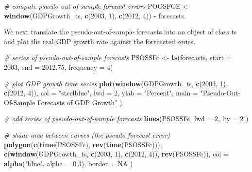 \documentclass[]{book}
\newenvironment{Shaded}{\begin{snugshade}}{\end{snugshade}}
\newcommand{\KeywordTok}[1]{\textcolor[rgb]{0.13,0.29,0.53}{\textbf{#1}}}
\newcommand{\DataTypeTok}[1]{\textcolor[rgb]{0.13,0.29,0.53}{#1}}
\newcommand{\DecValTok}[1]{\textcolor[rgb]{0.00,0.00,0.81}{#1}}
\newcommand{\FloatTok}[1]{\textcolor[rgb]{0.00,0.00,0.81}{#1}}
\newcommand{\StringTok}[1]{\textcolor[rgb]{0.31,0.60,0.02}{#1}}
\newcommand{\CommentTok}[1]{\textcolor[rgb]{0.56,0.35,0.01}{\textit{#1}}}
\newcommand{\OtherTok}[1]{\textcolor[rgb]{0.56,0.35,0.01}{#1}}
\newcommand{\OperatorTok}[1]{\textcolor[rgb]{0.81,0.36,0.00}{\textbf{#1}}}
\newcommand{\NormalTok}[1]{#1}
\theoremstyle{definition}
\theoremstyle{definition}
\theoremstyle{definition}
\theoremstyle{remark}
\begin{document}
\begin{Shaded}
\begin{Highlighting}[]
\CommentTok{# compute psuedo-out-of-sample forecast errors}
\NormalTok{POOSFCE <-}\StringTok{ }\KeywordTok{window}\NormalTok{(GDPGrowth_ts, }\KeywordTok{c}\NormalTok{(}\DecValTok{2003}\NormalTok{, }\DecValTok{1}\NormalTok{), }\KeywordTok{c}\NormalTok{(}\DecValTok{2012}\NormalTok{, }\DecValTok{4}\NormalTok{)) }\OperatorTok{-}\StringTok{ }\NormalTok{forecasts}
\end{Highlighting}
\end{Shaded}

We next translate the pseudo-out-of-sample forecasts into an object of
class ts and plot the real GDP growth rate against the forecasted
series.

\begin{Shaded}
\begin{Highlighting}[]
\CommentTok{# series of pseudo-out-of-sample forecasts}
\NormalTok{PSOSSFc <-}\StringTok{ }\KeywordTok{ts}\NormalTok{(forecasts, }
              \DataTypeTok{start =} \DecValTok{2003}\NormalTok{, }
              \DataTypeTok{end =} \FloatTok{2012.75}\NormalTok{, }
              \DataTypeTok{frequency =} \DecValTok{4}\NormalTok{)}

\CommentTok{# plot GDP growth time series}
\KeywordTok{plot}\NormalTok{(}\KeywordTok{window}\NormalTok{(GDPGrowth_ts, }\KeywordTok{c}\NormalTok{(}\DecValTok{2003}\NormalTok{, }\DecValTok{1}\NormalTok{), }\KeywordTok{c}\NormalTok{(}\DecValTok{2012}\NormalTok{, }\DecValTok{4}\NormalTok{)),}
     \DataTypeTok{col =} \StringTok{"steelblue"}\NormalTok{,}
     \DataTypeTok{lwd =} \DecValTok{2}\NormalTok{,}
     \DataTypeTok{ylab =} \StringTok{"Percent"}\NormalTok{,}
     \DataTypeTok{main =} \StringTok{"Pseudo-Out-Of-Sample Forecasts of GDP Growth"}
\NormalTok{     )}

\CommentTok{# add series of pseudo-out-of-sample forecasts}
\KeywordTok{lines}\NormalTok{(PSOSSFc, }
      \DataTypeTok{lwd =} \DecValTok{2}\NormalTok{, }
      \DataTypeTok{lty =} \DecValTok{2}
\NormalTok{      )}

\CommentTok{# shade area between curves (the pseudo forecast error)}
\KeywordTok{polygon}\NormalTok{(}\KeywordTok{c}\NormalTok{(}\KeywordTok{time}\NormalTok{(PSOSSFc), }\KeywordTok{rev}\NormalTok{(}\KeywordTok{time}\NormalTok{(PSOSSFc))), }
        \KeywordTok{c}\NormalTok{(}\KeywordTok{window}\NormalTok{(GDPGrowth_ts, }\KeywordTok{c}\NormalTok{(}\DecValTok{2003}\NormalTok{, }\DecValTok{1}\NormalTok{), }\KeywordTok{c}\NormalTok{(}\DecValTok{2012}\NormalTok{, }\DecValTok{4}\NormalTok{)), }\KeywordTok{rev}\NormalTok{(PSOSSFc)),}
        \DataTypeTok{col =} \KeywordTok{alpha}\NormalTok{(}\StringTok{"blue"}\NormalTok{, }\DataTypeTok{alpha =} \FloatTok{0.3}\NormalTok{),}
        \DataTypeTok{border =} \OtherTok{NA}
\NormalTok{        )}


\end{Highlighting}
\end{Shaded}
\end{document}
